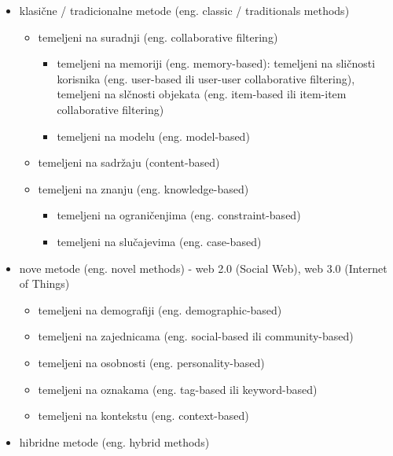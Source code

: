 \documentclass[a4paper,oneside,12pt]{memoir} %
\begin{document}
\begin{itemize}[topsep=2pt]
\setlength{\parskip}{0pt}
\item klasične / tradicionalne metode (eng. classic / traditionals methods)
  \begin{itemize}[topsep=2pt]
  \setlength{\parskip}{0pt}
  \item temeljeni na suradnji (eng. collaborative filtering)
    \begin{itemize}[topsep=2pt]
    \setlength{\parskip}{0pt}
    \item temeljeni na memoriji (eng. memory-based): temeljeni na sličnosti korisnika (eng. user-based ili user-user collaborative filtering), temeljeni na slčnosti objekata (eng. item-based ili item-item collaborative filtering)
    \item temeljeni na modelu (eng. model-based)
    \end{itemize}
  \item temeljeni na sadržaju (content-based)
  \item temeljeni na znanju (eng. knowledge-based)
    \begin{itemize}[topsep=2pt]
	\setlength{\parskip}{0pt}
    \item temeljeni na ograničenjima (eng. constraint-based)
	\item temeljeni na slučajevima (eng. case-based)
	\end{itemize}
  \end{itemize}
\item nove metode (eng. novel methods) - web 2.0 (Social Web), web 3.0 (Internet of Things)
    \begin{itemize}[topsep=2pt]
	\setlength{\parskip}{0pt}
    \item temeljeni na demografiji (eng. demographic-based)
    \item temeljeni na zajednicama (eng. social-based ili community-based)
    \item temeljeni na osobnosti (eng. personality-based)
    \item temeljeni na oznakama (eng. tag-based ili keyword-based)
    \item temeljeni na kontekstu (eng. context-based)
	\end{itemize}
\item hibridne metode (eng. hybrid methods)
\end{itemize}
\bigskip
\end{document}
